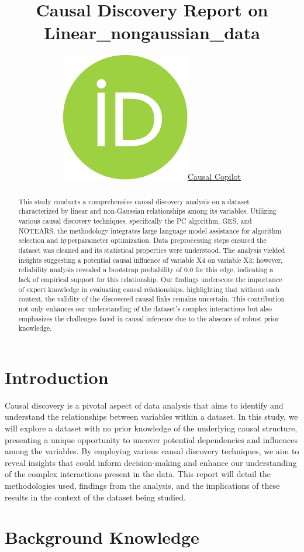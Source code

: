 \documentclass{article}
\title{Causal Discovery Report on Linear\_nongaussian\_data}
\author{ \href{https://orcid.org/0000-0000-0000-0000}{\includegraphics[scale=0.06]{postprocess/context/orcid.pdf}\hspace{1mm}Causal Copilot}}
\begin{document}
\maketitle

\begin{abstract}
This study conducts a comprehensive causal discovery analysis on a dataset characterized by linear and non-Gaussian relationships among its variables. Utilizing various causal discovery techniques, specifically the PC algorithm, GES, and NOTEARS, the methodology integrates large language model assistance for algorithm selection and hyperparameter optimization. Data preprocessing steps ensured the dataset was cleaned and its statistical properties were understood. The analysis yielded insights suggesting a potential causal influence of variable X4 on variable X3; however, reliability analysis revealed a bootstrap probability of 0.0 for this edge, indicating a lack of empirical support for this relationship. Our findings underscore the importance of expert knowledge in evaluating causal relationships, highlighting that without such context, the validity of the discovered causal links remains uncertain. This contribution not only enhances our understanding of the dataset's complex interactions but also emphasizes the challenges faced in causal inference due to the absence of robust prior knowledge.
\end{abstract}


\raggedbottom
\section{Introduction}
Causal discovery is a pivotal aspect of data analysis that aims to identify and understand the relationships between variables within a dataset. In this study, we will explore a dataset with no prior knowledge of the underlying causal structure, presenting a unique opportunity to uncover potential dependencies and influences among the variables. By employing various causal discovery techniques, we aim to reveal insights that could inform decision-making and enhance our understanding of the complex interactions present in the data. This report will detail the methodologies used, findings from the analysis, and the implications of these results in the context of the dataset being studied.

\section{Background Knowledge}
\end{document}
